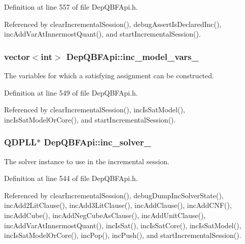 Definition at line 557 of file Dep\-Q\-B\-F\-Api.\-h.



Referenced by clear\-Incremental\-Session(), debug\-Assert\-Is\-Declared\-Inc(), inc\-Add\-Var\-At\-Innermost\-Quant(), and start\-Incremental\-Session().

\hypertarget{classDepQBFApi_a45305a0f7bb106f43eb7d12554e71564}{
\subsubsection[{inc\-\_\-model\-\_\-vars\-\_\-}]{\setlength{\rightskip}{0pt plus 5cm}vector$<$int$>$ Dep\-Q\-B\-F\-Api\-::inc\-\_\-model\-\_\-vars\-\_\-\hspace{0.3cm}{\ttfamily [protected]}}}\label{classDepQBFApi_a45305a0f7bb106f43eb7d12554e71564}


The variables for which a satisfying assignment can be constructed. 



Definition at line 549 of file Dep\-Q\-B\-F\-Api.\-h.



Referenced by clear\-Incremental\-Session(), inc\-Is\-Sat\-Model(), inc\-Is\-Sat\-Model\-Or\-Core(), and start\-Incremental\-Session().

\hypertarget{classDepQBFApi_a22f9645648890b1997e702743fc2e8fe}{
\subsubsection[{inc\-\_\-solver\-\_\-}]{\setlength{\rightskip}{0pt plus 5cm}Q\-D\-P\-L\-L$\ast$ Dep\-Q\-B\-F\-Api\-::inc\-\_\-solver\-\_\-\hspace{0.3cm}{\ttfamily [protected]}}}\label{classDepQBFApi_a22f9645648890b1997e702743fc2e8fe}


The solver instance to use in the incremental session. 



Definition at line 544 of file Dep\-Q\-B\-F\-Api.\-h.



Referenced by clear\-Incremental\-Session(), debug\-Dump\-Inc\-Solver\-State(), inc\-Add2\-Lit\-Clause(), inc\-Add3\-Lit\-Clause(), inc\-Add\-Clause(), inc\-Add\-C\-N\-F(), inc\-Add\-Cube(), inc\-Add\-Neg\-Cube\-As\-Clause(), inc\-Add\-Unit\-Clause(), inc\-Add\-Var\-At\-Innermost\-Quant(), inc\-Is\-Sat(), inc\-Is\-Sat\-Core(), inc\-Is\-Sat\-Model(), inc\-Is\-Sat\-Model\-Or\-Core(), inc\-Pop(), inc\-Push(), and start\-Incremental\-Session().

